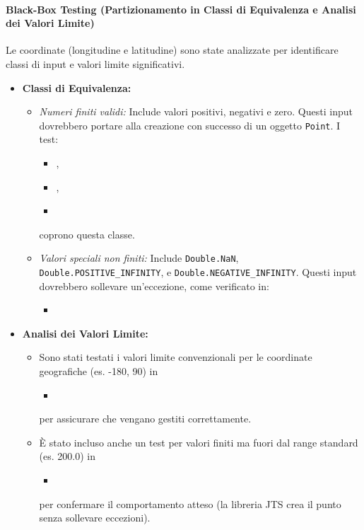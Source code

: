 \paragraph{Black-Box Testing (Partizionamento in Classi di Equivalenza e Analisi dei Valori Limite)}
Le coordinate (longitudine e latitudine) sono state analizzate per identificare classi di input e valori limite significativi.
\begin{itemize}
    \item \textbf{Classi di Equivalenza:}
    \begin{itemize}
        \item \textit{Numeri finiti validi:} Include valori positivi, negativi e zero. Questi input dovrebbero portare alla creazione con successo di un oggetto \texttt{Point}. I test:\\
        \begin{itemize}
        \item {},
        \item {},
        \item {}
        \end{itemize}
        coprono questa classe.
        \item \textit{Valori speciali non finiti:} Include \texttt{Double.NaN}, \texttt{Double.POSITIVE\_INFINITY}, e \texttt{Double.NEGATIVE\_INFINITY}. Questi input dovrebbero sollevare un'eccezione, come verificato in:
        \begin{itemize}
        	\item {}
        \end{itemize}
    \end{itemize}
    \item \textbf{Analisi dei Valori Limite:}
    \begin{itemize}
        \item Sono stati testati i valori limite convenzionali per le coordinate geografiche (es. -180, 90) in
        \begin{itemize}
        	\item {}
        \end{itemize}
        per assicurare che vengano gestiti correttamente.
        \item È stato incluso anche un test per valori finiti ma fuori dal range standard (es. 200.0) in
        \begin{itemize}
        	\item  {}
        \end{itemize}
        per confermare il comportamento atteso (la libreria JTS crea il punto senza sollevare eccezioni).
    \end{itemize}
\end{itemize}

